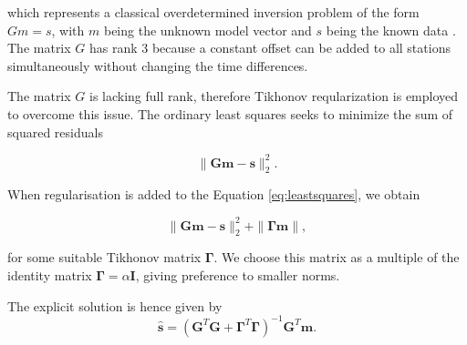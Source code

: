 \documentclass[12pt,a4paper,english]{article}
\begin{document}
which represents a classical overdetermined inversion problem of the form $Gm = s$, with $m$ being the unknown model vector and $s$ being the known data \cite{sens2008}. The matrix $G$ has rank 3 because a constant offset can be added to all stations simultaneously without changing the time differences. 

The matrix $G$ is lacking full rank, therefore Tikhonov reqularization is employed to overcome this issue. The ordinary least squares seeks to minimize the sum of squared residuals

\begin{equation}
\| \mathbf{Gm}-\mathbf{s} \|_2^2.
\label{eq:leastsquares}
\end{equation}

When regularisation is added to the Equation \ref{eq:leastsquares}, we obtain

\begin{equation}
\| \mathbf{Gm}-\mathbf{s} \|_2^2 + \| \bm{\Gamma}\mathbf{m} \|, 
\label{eq:tikhonov}
\end{equation}

for some suitable Tikhonov matrix $\bm{\Gamma}$. We choose this matrix as a multiple of the identity matrix $\bm{\Gamma} = \alpha\mathbf{I}$, giving preference to smaller norms. 

The explicit solution is hence given by 
\begin{equation}
\hat{\mathbf{s}} = (\mathbf{G}^T\mathbf{G} + \bm{\Gamma}^T\bm{\Gamma})^{-1}\mathbf{G}^T\mathbf{m}.  
\end{equation}

  
   
\end{document}
